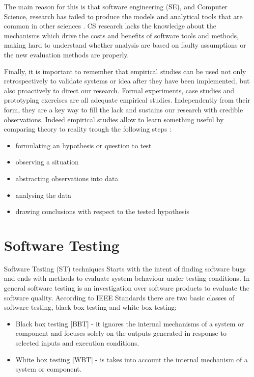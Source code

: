 The main reason for this is that software engineering (SE), and Computer Science, research has failed to produce the models and analytical tools that are common in other sciences \cite{Perry:2000:ESS:336512.336586}. CS research lacks the knowledge about the mechanisms which drive the costs and benefits of software tools and methods, making hard to understand whether analysis are  based on faulty assumptions or the new evaluation methods are properly.

Finally,  it is important to remember that empirical studies can be used not only retrospectively to validate systems or idea after they have been implemented, but also proactively to direct our research. Formal experiments, case studies and prototyping exercises are all adequate empirical studies. Independently from their form, they are a key way to fill the lack and sustains our research with credible observations. Indeed empirical studies allow to learn something useful by comparing theory to reality trough the following steps \cite{Perry:2000:ESS:336512.336586}:
\begin{itemize}
\item  formulating an hypothesis or question to test
\item  observing a situation
\item  abstracting observations into data
\item  analysing the data
\item  drawing conclusions with respect to the tested hypothesis
\end{itemize}

\section{Software Testing}\label{sec:software-testing}
Software Testing (ST) techniques Starts with the intent of finding software bugs and ends with methods to evaluate system behaviour under testing conditions. In general software testing is an investigation over software products to evaluate the software quality. According to IEEE Standards  \cite{IEEEStd610.12-1990:glossary} there are two basic classes of software testing, black box testing and white box testing: 

\begin{itemize}
\item Black box testing [BBT] - it ignores the internal mechanisms of a system or component and focuses solely on the outputs
generated in response to selected inputs and execution conditions.
\item White box testing [WBT] - is takes into account the internal mechanism of a system or component. 
\end{itemize} 

